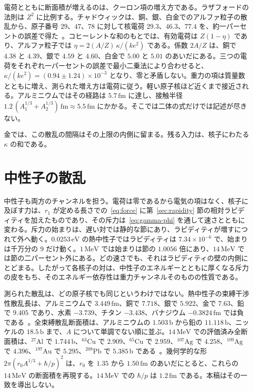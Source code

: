 \documentclass[a4paper]{article}
\begin{document}
電荷とともに断面積が増えるのは、クーロン項の増え方である。ラザフォードの法則は \(Z^{2}\) に比例する。チャドウィックは、銅、銀、白金でのアルファ粒子の散乱から、原子番号 \(29\)、\(47\)、\(78\) に対して核電荷 \(29.3\)、\(46.3\)、\(77.4\) を、約一パーセントの誤差で得た~\cite{chadwick1920}。コヒーレントな和のもとでは、有効電荷は \(Z(1-\eta)\) であり、アルファ粒子では \(\eta=2(A/Z)\,\kappa/(ke^{2})\) である。係数 \(2A/Z\) は、銅で \(4.38\) と \(4.39\)、銀で \(4.59\) と \(4.60\)、白金で \(5.00\) と \(5.01\) のあいだにある。三つの電荷をそれぞれ一パーセントの誤差で最小二乗法により合わせると、\(\kappa/(ke^{2})=(0.94\pm 1.24)\times 10^{-3}\) となり、零と矛盾しない。重力の項は質量数とともに増え、測られた増え方は電荷に従う。軽い原子核ほど近くまで接近される。アルミニウムではその経路は \(5.7\,\mathrm{fm}\) に達し、接触半径 \(1.2\,(A_1^{1/3}+A_2^{1/3})\,\mathrm{fm}\approx 5.5\,\mathrm{fm}\) にかかる。そこでは二体の式だけでは記述が尽きない。

金では、この散乱の間隔はその上限の内側に留まる。残る入力は、核子にわたる \(\kappa\) の和である。

\section{中性子の散乱}
\label{sec:neutron}

中性子も両方のチャンネルを担う。電荷は零であるから電気の項はなく、核子に及ぼす力は、\(r_1\) が定める長さでの~\eqref{eq:force} に第~\ref{sec:rapidity} 節の相対ラピディティを加えたものであり、その斥力は~\eqref{eq:gamma-phi} を通して速さとともに変わる。斥力の始まりは、遅い対では静的な節にあり、ラピディティが増すにつれて外へ動く。\(0.0253\,\mathrm{eV}\) の熱中性子ではラピディティは \(7.34\times 10^{-6}\) で、始まりは千万分の \(9\) だけ動く。\(1\,\mathrm{MeV}\) では始まりは節の \(1.0056\) 倍にあり、\(14\,\mathrm{MeV}\) では節の二パーセント外にある。どの速さでも、それはラピディティの壁の内側にとどまる。したがって各核子の対は、中性子のエネルギーとともに厚くなる斥力の皮をもち、そのエネルギー依存性は重力チャンネルそのものの性質である。

測られた散乱は、どの原子核でも同じというわけではない。熱中性子の束縛干渉性散乱長は、アルミニウムで \(3.449\,\mathrm{fm}\)、銅で \(7.718\)、銀で \(5.922\)、金で \(7.63\)、鉛で \(9.405\) であり、水素 \(-3.739\)、チタン \(-3.438\)、バナジウム \(-0.3824\,\mathrm{fm}\) では負である~\cite{sears1992}。全束縛散乱断面積は、アルミニウムの \(1.503\,\mathrm{b}\) から鉛の \(11.118\,\mathrm{b}\)、ニッケルの \(18.5\,\mathrm{b}\) まで、\(A\) について単調でない順に並ぶ。\(14\,\mathrm{MeV}\) での評価済み全断面積は、\({}^{27}\mathrm{Al}\) で \(1.744\,\mathrm{b}\)、\({}^{63}\mathrm{Cu}\) で \(2.909\)、\({}^{65}\mathrm{Cu}\) で \(2.959\)、\({}^{107}\mathrm{Ag}\) で \(4.258\)、\({}^{109}\mathrm{Ag}\) で \(4.396\)、\({}^{197}\mathrm{Au}\) で \(5.295\)、\({}^{208}\mathrm{Pb}\) で \(5.385\,\mathrm{b}\) である~\cite{endf8}。幾何学的な形 \(2\pi(r_0A^{1/3}+\hbar/p)^{2}\) は、\(r_0\) を \(1.35\) から \(1.50\,\mathrm{fm}\) のあいだにとると、これらの \(14\,\mathrm{MeV}\) の断面積を再現する。\(14\,\mathrm{MeV}\) での \(\hbar/p\) は \(1.2\,\mathrm{fm}\) である。本稿はその一致を導出しない。
\end{document}
